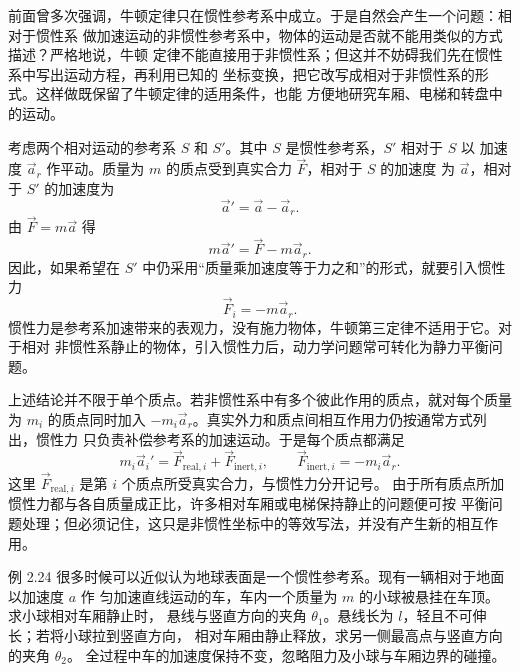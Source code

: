前面曾多次强调，牛顿定律只在惯性参考系中成立。于是自然会产生一个问题：相对于惯性系
做加速运动的非惯性参考系中，物体的运动是否就不能用类似的方式描述？严格地说，牛顿
定律不能直接用于非惯性系；但这并不妨碍我们先在惯性系中写出运动方程，再利用已知的
坐标变换，把它改写成相对于非惯性系的形式。这样做既保留了牛顿定律的适用条件，也能
方便地研究车厢、电梯和转盘中的运动。

考虑两个相对运动的参考系 $S$ 和 $S'$。其中 $S$ 是惯性参考系，$S'$ 相对于 $S$ 以
加速度 $\vec a_r$ 作平动。质量为 $m$ 的质点受到真实合力 $\vec F$，相对于 $S$ 的加速度
为 $\vec a$，相对于 $S'$ 的加速度为
\[
 \vec a'=\vec a-\vec a_r.
\]
由 $\vec F=m\vec a$ 得
\[
 m\vec a'=\vec F-m\vec a_r.
\]
因此，如果希望在 $S'$ 中仍采用“质量乘加速度等于力之和”的形式，就要引入惯性力
\begin{equation}
 \boxed{\vec F_i=-m\vec a_r}. \tag{2.12}
\end{equation}
惯性力是参考系加速带来的表观力，没有施力物体，牛顿第三定律不适用于它。对于相对
非惯性系静止的物体，引入惯性力后，动力学问题常可转化为静力平衡问题。

上述结论并不限于单个质点。若非惯性系中有多个彼此作用的质点，就对每个质量为 $m_i$
的质点同时加入 $-m_i\vec a_r$。真实外力和质点间相互作用力仍按通常方式列出，惯性力
只负责补偿参考系的加速运动。于是每个质点都满足
\[
 m_i\vec a_i'=\vec F_{\mathrm{real},i}+\vec F_{\mathrm{inert},i},
 \qquad \vec F_{\mathrm{inert},i}=-m_i\vec a_r.
\]
这里 $\vec F_{\mathrm{real},i}$ 是第 $i$ 个质点所受真实合力，与惯性力分开记号。
由于所有质点所加惯性力都与各自质量成正比，许多相对车厢或电梯保持静止的问题便可按
平衡问题处理；但必须记住，这只是非惯性坐标中的等效写法，并没有产生新的相互作用。



\begin{origexamplebox}{例 2.24}
很多时候可以近似认为地球表面是一个惯性参考系。现有一辆相对于地面以加速度 $a$ 作
匀加速直线运动的车，车内一个质量为 $m$ 的小球被悬挂在车顶。求小球相对车厢静止时，
悬线与竖直方向的夹角 $\theta_1$。悬线长为 $l$，轻且不可伸长；若将小球拉到竖直方向，
相对车厢由静止释放，求另一侧最高点与竖直方向的夹角 $\theta_2$。
全过程中车的加速度保持不变，忽略阻力及小球与车厢边界的碰撞。
\probdiagTwoTwentyFour
\end{origexamplebox}

